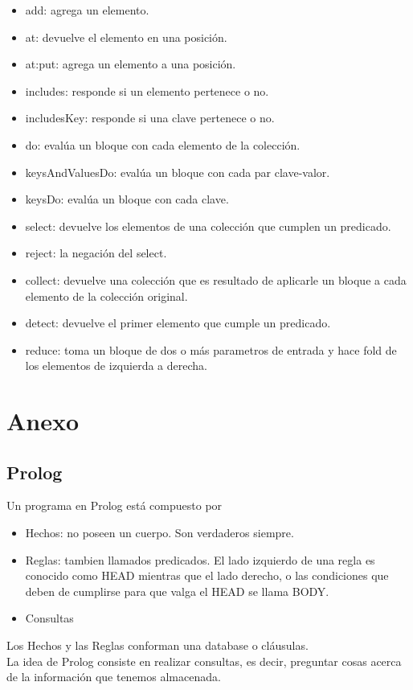 \documentclass[10pt,a4paper]{article}
\begin{document}
\begin{itemize}
    \item add: agrega un elemento.
    \item at: devuelve el elemento en una posición.
    \item at:put: agrega un elemento a una posición.
    \item includes: responde si un elemento pertenece o no.
    \item includesKey: responde si una clave pertenece o no.
    \item do: evalúa un bloque con cada elemento de la colección.
    \item keysAndValuesDo: evalúa un bloque con cada par clave-valor. 
    \item keysDo: evalúa un bloque con cada clave.
    \item select: devuelve los elementos de una colección que cumplen un predicado. 
    \item reject: la negación del select.
    \item collect: devuelve una colección que es resultado de aplicarle un bloque a cada elemento de la colección original.
    \item detect: devuelve el primer elemento que cumple un predicado. 
    \item reduce: toma un bloque de dos o más parametros de entrada y hace fold de los elementos de izquierda a derecha.
\end{itemize}

\section*{Anexo}
\subsection*{Prolog}
Un programa en Prolog está compuesto por
\begin{itemize}
    \item Hechos: no poseen un cuerpo. Son verdaderos siempre.
    \item Reglas: tambien llamados predicados. El lado izquierdo de una regla es conocido como HEAD mientras que el lado derecho, o las condiciones que deben de cumplirse para que valga el HEAD se llama BODY.
    \item Consultas
\end{itemize}
Los Hechos y las Reglas conforman una database o cláusulas. \\
La idea de Prolog consiste en realizar consultas, es decir, preguntar cosas acerca de la información que tenemos almacenada. 
\end{document}
